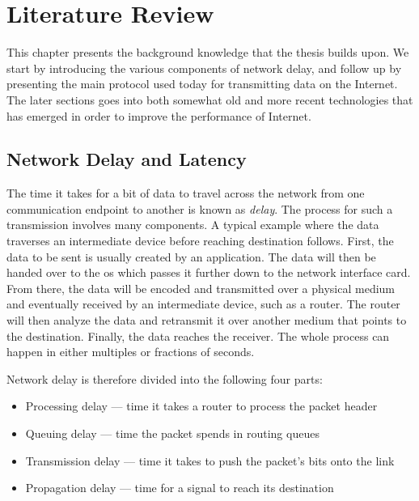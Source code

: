 \chapter{Literature Review} \label{ch:background}


This chapter presents the background knowledge that the thesis builds upon. We start by introducing the various components of network delay, and follow up by presenting the main protocol used today for transmitting data on the Internet. The later sections goes into both somewhat old and more recent technologies that has emerged in order to improve the performance of Internet.









\section{Network Delay and Latency}

The time it takes for a bit of data to travel across the network from one communication endpoint to another is known as \textit{delay}. The process for such a transmission involves many components. A typical example where the data traverses an intermediate device before reaching destination follows. First, the data to be sent is usually created by an application. The data will then be handed over to the \gls{os} which passes it further down to the network interface card. From there, the data will be encoded and transmitted over a physical medium and eventually received by an intermediate device, such as a router. The router will then analyze the data and retransmit it over another medium that points to the destination. Finally, the data reaches the receiver. The whole process can happen in either multiples or fractions of seconds.

Network delay is therefore divided into the following four parts:

\begin{itemize}
    \item Processing delay --- time it takes a router to process the packet header
    \item Queuing delay --- time the packet spends in routing queues
    \item Transmission delay --- time it takes to push the packet's bits onto the link
    \item Propagation delay --- time for a signal to reach its destination
\end{itemize}


